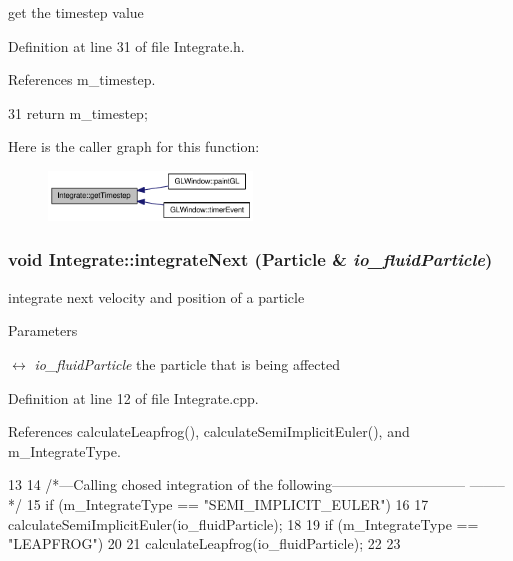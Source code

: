 get the timestep value 



Definition at line 31 of file Integrate.h.



References m\_\-timestep.




\begin{DoxyCode}
31 { return m_timestep; }
\end{DoxyCode}




Here is the caller graph for this function:\nopagebreak
\begin{figure}[H]
\begin{center}
\leavevmode
\includegraphics[width=154pt]{class_integrate_a1dc56e84dd8f2577f068be719d64a36b_icgraph}
\end{center}
\end{figure}


\hypertarget{class_integrate_ada967b8b2b909f7c827009dad33738ec}{
\subsubsection[{integrateNext}]{\setlength{\rightskip}{0pt plus 5cm}void Integrate::integrateNext ({\bf Particle} \& {\em io\_\-fluidParticle})}}
\label{class_integrate_ada967b8b2b909f7c827009dad33738ec}


integrate next velocity and position of a particle 


\begin{DoxyParams}{Parameters}
\item[\mbox{$\leftrightarrow$} {\em io\_\-fluidParticle}]the particle that is being affected \end{DoxyParams}


Definition at line 12 of file Integrate.cpp.



References calculateLeapfrog(), calculateSemiImplicitEuler(), and m\_\-IntegrateType.




\begin{DoxyCode}
13 {
14     /*---Calling chosed integration of the following-----------------------------
      --------*/
15     if (m_IntegrateType == "SEMI_IMPLICIT_EULER")
16     {
17         calculateSemiImplicitEuler(io_fluidParticle);
18     }
19     if (m_IntegrateType == "LEAPFROG")
20     {
21         calculateLeapfrog(io_fluidParticle);
22     }
23 }
\end{DoxyCode}




